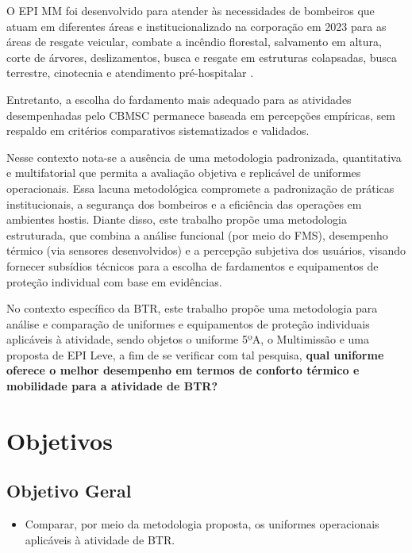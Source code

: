 		O \acrshort{EPI} \acrlong{MM} foi desenvolvido para atender às necessidades de bombeiros que atuam 
		em diferentes áreas e institucionalizado na corporação em 2023 para as áreas de resgate 
		veicular, combate a incêndio florestal, salvamento em altura, corte de árvores, 
		deslizamentos, busca e resgate em estruturas colapsadas, busca terrestre, cinotecnia 
		e atendimento pré-hospitalar \cite{res16}. 
		
		Entretanto, a escolha do fardamento mais adequado para as atividades desempenhadas pelo
		\acrshort{CBMSC} permanece baseada em percepções empíricas, sem respaldo em critérios 
		comparativos sistematizados e validados.

		Nesse contexto nota-se a ausência de uma metodologia padronizada, quantitativa e multifatorial que 
		permita a avaliação objetiva e replicável de uniformes operacionais. Essa lacuna metodológica 
		compromete a padronização de práticas institucionais, a segurança dos bombeiros e a eficiência 
		das operações em ambientes hostis. Diante disso, este trabalho propõe uma metodologia estruturada, 
		que combina a análise funcional (por meio do \acrfull{FMS}), desempenho térmico (via sensores 
		desenvolvidos) e a percepção subjetiva dos usuários, visando fornecer subsídios técnicos para 
		a escolha de fardamentos e equipamentos de proteção individual com base em evidências.

		No contexto específico da \acrlong{BTR}, este trabalho propõe uma metodologia 
		para análise e comparação de uniformes e equipamentos de proteção individuais aplicáveis à 
		atividade, sendo objetos o uniforme 5ºA, o Multimissão e uma proposta de \acrshort{EPI} Leve, 
		a fim de se verificar com tal pesquisa, \textbf{qual uniforme oferece o melhor desempenho 
	 	em termos de conforto térmico e mobilidade para a atividade de \acrlong{BTR}?}

	\section{Objetivos}

		\subsection{Objetivo Geral}
			\begin{itemize}
				\item Comparar, por meio da metodologia proposta, os uniformes operacionais 
				aplicáveis à atividade de \acrlong{BTR}.
			\end{itemize}

